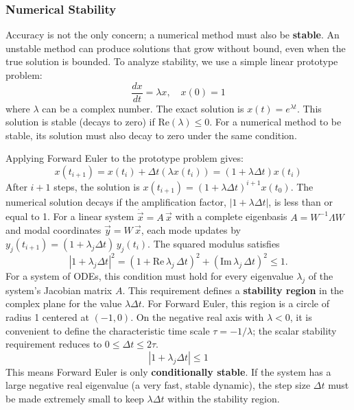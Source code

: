 \subsubsection{Numerical Stability}
\label{subsec:ivp-stability}
Accuracy is not the only concern; a numerical method must also be \textbf{stable}. An unstable method can produce solutions that grow without bound, even when the true solution is bounded. To analyze stability, we use a simple linear prototype problem:
\begin{equation}
    \frac{dx}{dt} = \lambda x, \quad x(0) = 1
\end{equation}
where $\lambda$ can be a complex number. The exact solution is $x(t) = e^{\lambda t}$. This solution is stable (decays to zero) if $\text{Re}(\lambda) \le 0$. For a numerical method to be stable, its solution must also decay to zero under the same condition.

Applying Forward Euler to the prototype problem gives:
\begin{equation}
    x(t_{i+1}) = x(t_i) + \Delta t (\lambda x(t_i)) = (1 + \lambda \Delta t) x(t_i)
\end{equation}
After $i+1$ steps, the solution is $x(t_{i+1}) = (1 + \lambda \Delta t)^{i+1} x(t_0)$. The numerical solution decays if the amplification factor, $|1 + \lambda \Delta t|$, is less than or equal to 1. For a linear system $\dot{\vec{x}}=A\,\vec{x}$ with a complete eigenbasis $A=W^{-1}\Lambda W$ and modal coordinates $\vec{y}=W\,\vec{x}$, each mode updates by $y_j(t_{i+1})=(1+\lambda_j\Delta t)\,y_j(t_i)$. The squared modulus satisfies
\begin{equation}
    |1+\lambda_j\Delta t|^2 = (1+\mathrm{Re}\,\lambda_j\,\Delta t)^2 + (\mathrm{Im}\,\lambda_j\,\Delta t)^2 \le 1.
\end{equation}
For a system of ODEs, this condition must hold for every eigenvalue $\lambda_j$ of the system's Jacobian matrix $A$. This requirement defines a \textbf{stability region} in the complex plane for the value $\lambda \Delta t$. For Forward Euler, this region is a circle of radius 1 centered at $(-1, 0)$. On the negative real axis with $\lambda<0$, it is convenient to define the characteristic time scale $\tau=-1/\lambda$; the scalar stability requirement reduces to $0\le \Delta t \le 2\tau$.
\begin{equation}
    |1 + \lambda_j \Delta t| \le 1
\end{equation}
This means Forward Euler is only \textbf{conditionally stable}. If the system has a large negative real eigenvalue (a very fast, stable dynamic), the step size $\Delta t$ must be made extremely small to keep $\lambda \Delta t$ within the stability region.


